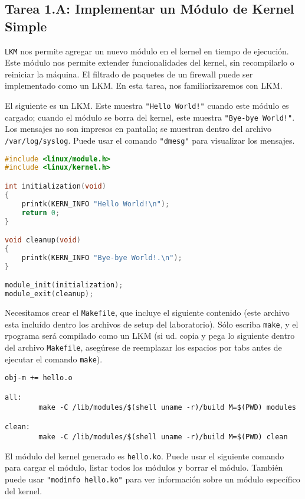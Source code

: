 \subsection{Tarea 1.A: Implementar un Módulo de Kernel Simple}

{\tt LKM} nos permite agregar un nuevo módulo en el kernel en tiempo de ejecución.
Este módulo nos permite extender funcionalidades del kernel, sin recompilarlo o reiniciar la máquina.
El filtrado de paquetes de un firewall puede ser implementado como un LKM.
En esta tarea, nos familiarizaremos con LKM.

El siguiente es un LKM. Este muestra \texttt{"Hello World!"} cuando este módulo es cargado; cuando el módulo se borra del kernel, este muestra \texttt{"Bye-bye World!"}.
Los mensajes no son impresos en pantalla; se muestran dentro del archivo \texttt{/var/log/syslog}. Puede usar el comando \texttt{"dmesg"} para visualizar los mensajes.


\begin{lstlisting}[language=C, caption=\texttt{hello.c} (included in the lab setup files)]
#include <linux/module.h>
#include <linux/kernel.h>

int initialization(void)
{
    printk(KERN_INFO "Hello World!\n");
    return 0;
}

void cleanup(void)
{
    printk(KERN_INFO "Bye-bye World!.\n");
}

module_init(initialization);
module_exit(cleanup);
\end{lstlisting}

Necesitamos crear el {\tt Makefile}, que incluye el siguiente contenido (este archivo esta incluído dentro los archivos de setup del laboratorio).
Sólo escriba {\tt make}, y el rpograma será compilado como un LKM (si ud. copia y pega lo siguiente dentro del archivo \texttt{Makefile}, asegúrese de reemplazar los espacios por tabs antes de ejecutar el comando \texttt{make}).


\begin{lstlisting}
obj-m += hello.o

all:
        make -C /lib/modules/$(shell uname -r)/build M=$(PWD) modules

clean:
        make -C /lib/modules/$(shell uname -r)/build M=$(PWD) clean
\end{lstlisting}

El módulo del kernel generado es \texttt{hello.ko}. 
Puede usar el siguiente comando para cargar el módulo, listar todos los módulos y borrar el módulo.
También puede usar \texttt{"modinfo hello.ko"} para ver información sobre un módulo específico del kernel.

